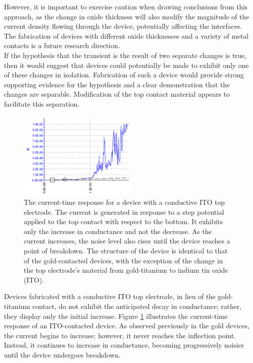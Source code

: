 \noindent However, it is important to exercise caution when drawing conclusions from this approach, as the change in oxide thickness will also modify the magnitude of the current density flowing through the device, potentially affecting the interfaces. The fabrication of devices with different oxide thicknesses and a variety of metal contacts is a future research direction. \\

\noindent If the hypothesis that the transient is the result of two separate changes is true, then it would suggest that devices could potentially be made to exhibit only one of these changes in isolation. Fabrication of such a device would provide strong supporting evidence for the hypothesis and a clear demonstration that the changes are separable. Modification of the top contact material appears to facilitate this separation.\\

\begin{figure}[htbp!] 
\centering    
\includegraphics[width=0.5\textwidth]{Chapter2/Figs/2h.png}
\caption[The current-time response for a device with a conductive ITO top electrode.]{The current-time response for a device with a conductive ITO top electrode. The current is generated in response to a step potential applied to the top contact with respect to the bottom. It exhibits only the increase in conductance and not the decrease. As the current increases, the noise level also rises until the device reaches a point of breakdown. The structure of the device is identical to that of the gold-contacted devices, with the exception of the change in the top electrode's material from gold-titanium to indium tin oxide (ITO).}
\label{fig:2h}
\end{figure}

\noindent Devices fabricated with a conductive ITO top electrode, in lieu of the gold-titanium contact, do not exhibit the anticipated decay in conductance; rather, they display only the initial increase. Figure \ref{fig:2h} illustrates the current-time response of an ITO-contacted device. As observed previously in the gold devices, the current begins to increase; however, it never reaches the inflection point. Instead, it continues to increase in conductance, becoming progressively noisier until the device undergoes breakdown.\\

